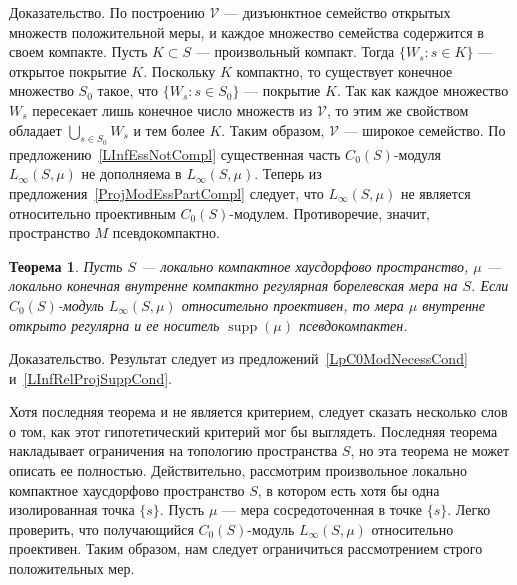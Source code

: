 \documentclass[12pt]{article}
\numberwithin{equation}{subsection}
\theoremstyle{plain}
\newtheorem{theorem}{Теорема}
\newenvironment{proof}{Доказательство.}{}
\begin{document}
\begin{fulltext}
\begin{proof}
        По построению $\mathcal{V}$ --- дизъюнктное семейство открытых множеств
        положительной меры, и каждое множество семейства содержится в своем
        компакте. Пусть $K\subset S$ --- произвольный компакт. Тогда $\{W_s:s\in
            K\}$ --- открытое покрытие $K$. Поскольку $K$ компактно, то существует
        конечное множество $S_0$ такое, что $\{W_s:s\in S_0\}$ --- покрытие $K$.
        Так как каждое множество $W_s$ пересекает лишь конечное число множеств
        из $\mathcal{V}$, то этим же свойством обладает $\bigcup_{s\in S_0}W_s$
        и тем более $K$. Таким образом, $\mathcal{V}$ --- широкое семейство. По
        предложению~\ref{LInfEssNotCompl} существенная часть $C_0(S)$-модуля
        $L_\infty(S,\mu)$ не дополняема в $L_\infty(S,\mu)$. Теперь из
        предложения~\ref{ProjModEssPartCompl} следует, что $L_\infty(S,\mu)$ не
        является относительно проективным $C_0(S)$-модулем. Противоречие,
        значит, пространство $M$ псевдокомпактно.
    \end{proof}

    \begin{theorem}\label{LInfReProjNecessCond} Пусть $S$ --- локально
        компактное хаусдорфово пространство, $\mu$ --- локально конечная
        внутренне компактно регулярная борелевская мера на $S$. Если
        $C_0(S)$-модуль $L_\infty(S,\mu)$ относительно проективен, то мера $\mu$
        внутренне открыто регулярна и ее носитель $\operatorname{supp}(\mu)$
        псевдокомпактен.

    \end{theorem}
    \begin{proof} Результат следует из предложений~\ref{LpC0ModNecessCond}
        и~\ref{LInfRelProjSuppCond}.
    \end{proof}

    Хотя последняя теорема и не является критерием, следует сказать несколько
    слов о том, как этот гипотетический критерий мог бы выглядеть. Последняя
    теорема накладывает ограничения на топологию пространства $S$, но эта
    теорема не может описать ее полностью. Действительно, рассмотрим
    произвольное локально компактное хаусдорфово пространство $S$, в котором
    есть хотя бы одна изолированная точка $\{s\}$. Пусть $\mu$ --- мера
    сосредоточенная в точке $\{s\}$. Легко проверить, что получающийся
    $C_0(S)$-модуль $L_\infty(S,\mu)$ относительно проективен. Таким образом,
    нам следует ограничиться рассмотрением строго положительных мер.


\end{fulltext}
\end{document}
